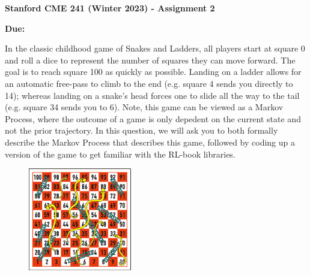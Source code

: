 \documentclass[12pt]{exam}
\begin{document}
\begin{center}
{\large {\bf Stanford CME 241 (Winter 2023) - Assignment 2}}
\end{center}
 
{\large{\bf Due:}}
\begin{questions}
\question In the classic childhood game of Snakes and Ladders, all players start at square 0 and roll a dice to represent the number of squares they can move forward. The goal is to reach square 100 as quickly as possible. Landing on a ladder allows for an automatic free-pass to climb to the end (e.g. square 4 sends you directly to 14); whereas landing on a snake's head forces one to slide all the way to the tail (e.g. square 34 sends you to 6). Note, this game can be viewed as a Markov Process, where the outcome of a game is only depedent on the current state and not the prior trajectory. In this question, we will ask you to both formally describe the Markov Process that describes this game, followed by coding up a version of the game to get familiar with the RL-book libraries.

\begin{figure}[h]
	\begin{center}
	\includegraphics[width=0.4\textwidth]{Figures/2_snakes_and_ladders.png}
	\end{center}
\end{figure}


\end{questions}
\end{document}
